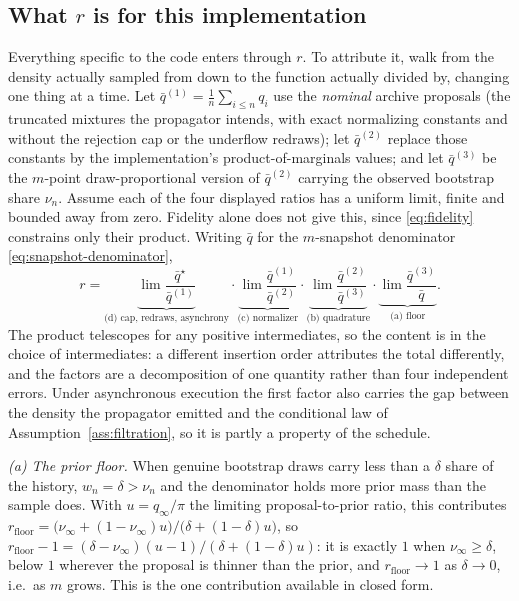 \documentclass[10pt]{article}
\theoremstyle{plain}
\theoremstyle{definition}
\begin{document}
\subsection{What $r$ is for this implementation}\label{sec:theory-r}
Everything specific to the code enters through $r$. To attribute it, walk from the density actually sampled from down to the function actually divided by, changing one thing at a time. Let $\bar q^{(1)}=\tfrac1n\sum_{i\le n}q_i$ use the \emph{nominal} archive proposals (the truncated mixtures the propagator intends, with exact normalizing constants and without the rejection cap or the underflow redraws); let $\bar q^{(2)}$ replace those constants by the implementation's product-of-marginals values; and let $\bar q^{(3)}$ be the $m$-point draw-proportional version of $\bar q^{(2)}$ carrying the observed bootstrap share $\nu_n$. Assume each of the four displayed ratios has a uniform limit, finite and bounded away from zero. Fidelity alone does not give this, since \eqref{eq:fidelity} constrains only their product. Writing $\bar q$ for the $m$-snapshot denominator \eqref{eq:snapshot-denominator},
\[
r=\underbrace{\lim\frac{\bar q^\star}{\bar q^{(1)}}}_{\text{(d) cap, redraws, asynchrony}}\cdot
\underbrace{\lim\frac{\bar q^{(1)}}{\bar q^{(2)}}}_{\text{(c) normalizer}}\cdot
\underbrace{\lim\frac{\bar q^{(2)}}{\bar q^{(3)}}}_{\text{(b) quadrature}}\cdot
\underbrace{\lim\frac{\bar q^{(3)}}{\bar q}}_{\text{(a) floor}} .
\]
The product telescopes for any positive intermediates, so the content is in the choice of intermediates: a different insertion order attributes the total differently, and the factors are a decomposition of one quantity rather than four independent errors. Under asynchronous execution the first factor also carries the gap between the density the propagator emitted and the conditional law of Assumption~\ref{ass:filtration}, so it is partly a property of the schedule.

\emph{(a) The prior floor.} When genuine bootstrap draws carry less than a $\delta$ share of the history, $w_n=\delta>\nu_n$ and the denominator holds more prior mass than the sample does. With $u=q_\infty/\pi$ the limiting proposal-to-prior ratio, this contributes
$r_{\mathrm{floor}}=\bigl(\nu_\infty+(1-\nu_\infty)u\bigr)/\bigl(\delta+(1-\delta)u\bigr)$, so $r_{\mathrm{floor}}-1=(\delta-\nu_\infty)(u-1)/(\delta+(1-\delta)u)$: it is exactly $1$ when $\nu_\infty\ge\delta$, below $1$ wherever the proposal is thinner than the prior, and $r_{\mathrm{floor}}\to1$ as $\delta\to0$, i.e.\ as $m$ grows. This is the one contribution available in closed form.
\end{document}
